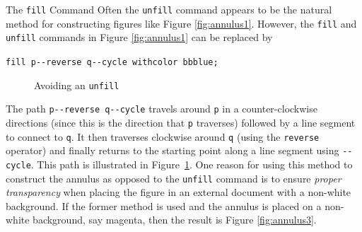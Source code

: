 \begin{subsection}{The \texttt{fill} Command}
Often the \texttt{unfill} command appears to be the natural method for constructing figures like Figure \ref{fig:annulus1}.  However, the \texttt{fill} and \texttt{unfill} commands in Figure \ref{fig:annulus1} can be replaced by \begin{center}\verb|fill p--reverse q--cycle withcolor bbblue;|\end{center}
\begin{figure}[hptb]
	\begin{center}\end{center}
	\caption{Avoiding an \texttt{unfill}}\label{fig:annulus2}
\end{figure}
The path \verb|p--reverse q--cycle| travels around \texttt{p} in a counter-clockwise directions (since this is the direction that \texttt{p} traverses) followed by a line segment to connect to \texttt{q}.  It then traverses clockwise around \texttt{q} (using the \texttt{reverse} operator) and finally returns to the starting point along a line segment using \texttt{-{}-cycle}.  This path is illustrated in Figure~\ref{fig:annulus2}.  One reason for using this method to construct the annulus as opposed to the \texttt{unfill} command is to ensure \textit{proper transparency} when placing the figure in an external document with a non-white background.  If the former method is used and the annulus is placed on a non-white background, say magenta, then the result is Figure \ref{fig:annulus3}.
\begin{figure}[ht]
	\begin{center}\end{center}

\end{figure}
\end{subsection}
